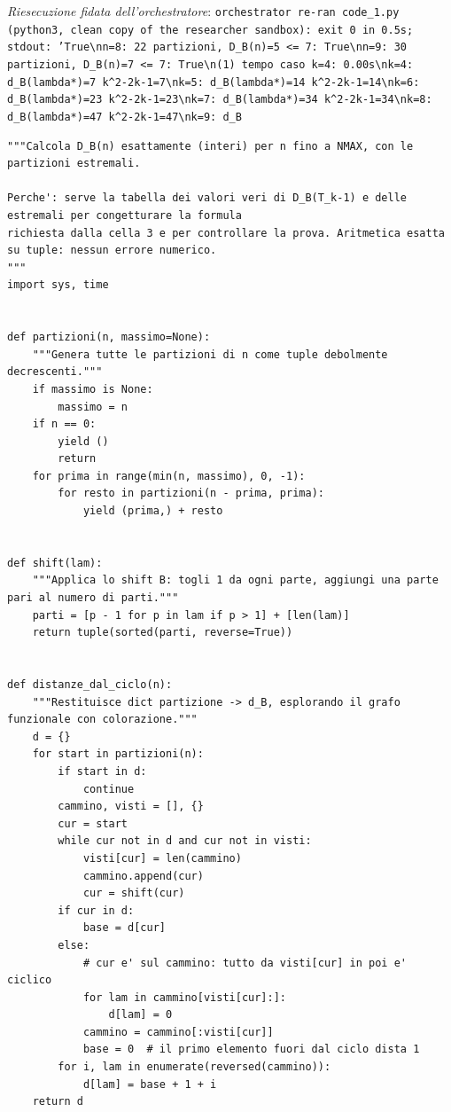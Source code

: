\documentclass[11pt,a4paper]{article}
\begin{document}
\noindent\emph{Riesecuzione fidata dell'orchestratore}: \texttt{orchestrator re-ran code\_1.py (python3, clean copy of the researcher sandbox): exit 0 in 0.5s; stdout: 'True\textbackslash{}nn=8: 22 partizioni, D\_B(n)=5 \textless{}= 7: True\textbackslash{}nn=9: 30 partizioni, D\_B(n)=7 \textless{}= 7: True\textbackslash{}n(1) tempo caso k=4: 0.00s\textbackslash{}nk=4: d\_B(lambda*)=7  k\textasciicircum{}2-2k-1=7\textbackslash{}nk=5: d\_B(lambda*)=14  k\textasciicircum{}2-2k-1=14\textbackslash{}nk=6: d\_B(lambda*)=23  k\textasciicircum{}2-2k-1=23\textbackslash{}nk=7: d\_B(lambda*)=34  k\textasciicircum{}2-2k-1=34\textbackslash{}nk=8: d\_B(lambda*)=47  k\textasciicircum{}2-2k-1=47\textbackslash{}nk=9: d\_B}
\begin{lstlisting}[caption={attempt\_001 code\_2 [python, rigore exact] — Modulo di supporto (db\_table.py): enumerazione delle partizioni di n, shift B, calcolo di  — verdetto del Referee: UNKNOWN\_STATUS}]
"""Calcola D_B(n) esattamente (interi) per n fino a NMAX, con le partizioni estremali.

Perche': serve la tabella dei valori veri di D_B(T_k-1) e delle estremali per congetturare la formula
richiesta dalla cella 3 e per controllare la prova. Aritmetica esatta su tuple: nessun errore numerico.
"""
import sys, time


def partizioni(n, massimo=None):
    """Genera tutte le partizioni di n come tuple debolmente decrescenti."""
    if massimo is None:
        massimo = n
    if n == 0:
        yield ()
        return
    for prima in range(min(n, massimo), 0, -1):
        for resto in partizioni(n - prima, prima):
            yield (prima,) + resto


def shift(lam):
    """Applica lo shift B: togli 1 da ogni parte, aggiungi una parte pari al numero di parti."""
    parti = [p - 1 for p in lam if p > 1] + [len(lam)]
    return tuple(sorted(parti, reverse=True))


def distanze_dal_ciclo(n):
    """Restituisce dict partizione -> d_B, esplorando il grafo funzionale con colorazione."""
    d = {}
    for start in partizioni(n):
        if start in d:
            continue
        cammino, visti = [], {}
        cur = start
        while cur not in d and cur not in visti:
            visti[cur] = len(cammino)
            cammino.append(cur)
            cur = shift(cur)
        if cur in d:
            base = d[cur]
        else:
            # cur e' sul cammino: tutto da visti[cur] in poi e' ciclico
            for lam in cammino[visti[cur]:]:
                d[lam] = 0
            cammino = cammino[:visti[cur]]
            base = 0  # il primo elemento fuori dal ciclo dista 1
        for i, lam in enumerate(reversed(cammino)):
            d[lam] = base + 1 + i
    return d



\end{lstlisting}
\end{document}
